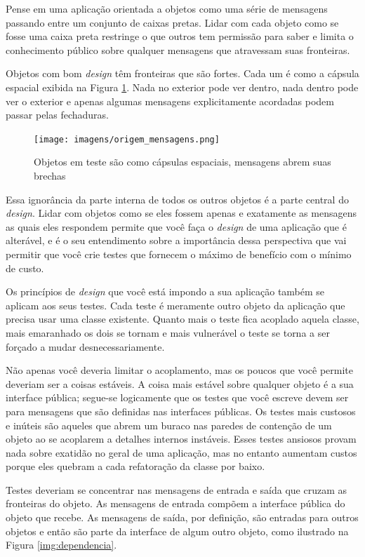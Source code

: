 Pense em uma aplicação orientada a objetos como uma série de mensagens passando entre um conjunto de caixas pretas. Lidar com cada objeto como se fosse uma caixa preta restringe o que outros tem permissão para saber e limita o conhecimento público sobre qualquer mensagens que atravessam suas fronteiras.

Objetos com bom \textit{design} têm fronteiras que são fortes. Cada um é como a cápsula espacial exibida na Figura \ref{img:origem_mensagens}. Nada no exterior pode ver dentro, nada dentro pode ver o exterior e apenas algumas mensagens explicitamente acordadas podem passar pelas fechaduras.

\begin{figure}[!htbp]
  \center
  \texttt{[image: imagens/origem\_mensagens.png]}
  \caption{Objetos em teste são como cápsulas espaciais, mensagens abrem suas brechas}
  \label{img:origem_mensagens}
\end{figure}

Essa ignorância da parte interna de todos os outros objetos é a parte central do \textit{design}. Lidar com objetos como se eles fossem apenas e exatamente as mensagens as quais eles respondem permite que você faça o \textit{design} de uma aplicação que é alterável, e é o seu entendimento sobre a importância dessa perspectiva que vai permitir que você crie testes que fornecem o máximo de benefício com o mínimo de custo.

Os princípios de \textit{design} que você está impondo a sua aplicação também se aplicam aos seus testes. Cada teste é meramente outro objeto da aplicação que precisa usar uma classe existente. Quanto mais o teste fica acoplado aquela classe, mais emaranhado os dois se tornam e mais vulnerável o teste se torna a ser forçado a mudar desnecessariamente.

Não apenas você deveria limitar o acoplamento, mas os poucos que você permite deveriam ser a coisas estáveis. A coisa mais estável sobre qualquer objeto é a sua interface pública; segue-se logicamente que os testes que você escreve devem ser para mensagens que são definidas nas interfaces públicas. Os testes mais custosos e inúteis são aqueles que abrem um buraco nas paredes de contenção de um objeto ao se acoplarem a detalhes internos instáveis. Esses testes ansiosos provam nada sobre exatidão no geral de uma aplicação, mas no entanto aumentam custos porque eles quebram a cada refatoração da classe por baixo.

Testes deveriam se concentrar nas mensagens de entrada e saída que cruzam as fronteiras do objeto. As mensagens de entrada compõem a interface pública do objeto que recebe. As mensagens de saída, por definição, são entradas para outros objetos e então são parte da interface de algum outro objeto, como ilustrado na Figura \ref{img:dependencia}.

